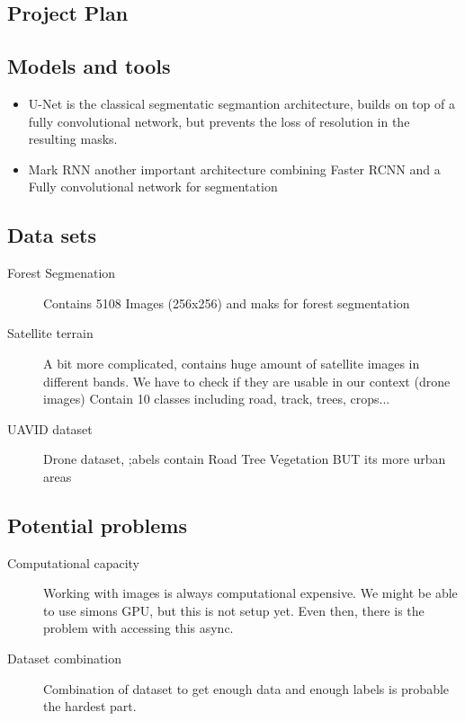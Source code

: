 \documentclass[rnd]{mas_proposal}
\begin{document}
\subsection{Project Plan}

    \subsection{Models and tools}
    \begin{itemize}
        \item U-Net is the classical segmentatic segmantion architecture, builds on top of a fully convolutional network, but prevents the loss of resolution in the resulting masks.
        \item Mark RNN another important architecture combining Faster RCNN and a Fully convolutional network for segmentation
    \end{itemize}

   
    \subsection{Data sets}
    \begin{description}
        \item[Forest Segmenation] Contains 5108 Images (256x256) and maks for forest segmentation
        \item[Satellite terrain] A bit more complicated, contains huge amount of satellite images in different bands. We have to check if they are usable in our context (drone images) Contain 10 classes including road, track, trees, crops...
        \item[UAVID dataset] Drone dataset, ;abels contain Road Tree Vegetation BUT its more urban areas
    \end{description}

    \subsection{Potential problems}
    \begin{description}
        \item[Computational capacity] Working with images is always computational expensive. We might be able to use simons GPU, but this is not setup yet. Even then, there is the problem with accessing this async.
        \item[Dataset combination] Combination of dataset to get enough data and enough labels is probable the hardest part.
    \end{description}
    



\nocite{*}

\end{document}
